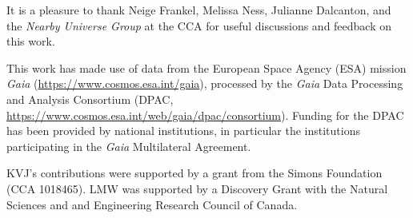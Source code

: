 \documentclass[modern]{aastex631}
\begin{document}
\begin{acknowledgements}

It is a pleasure to thank Neige Frankel, Melissa Ness, Julianne Dalcanton, and the
\textit{Nearby Universe Group} at the CCA for useful discussions and feedback on this
work.



This work has made use of data from the European Space Agency (ESA) mission
{\it Gaia} (\url{https://www.cosmos.esa.int/gaia}), processed by the {\it Gaia}
Data Processing and Analysis Consortium (DPAC,
\url{https://www.cosmos.esa.int/web/gaia/dpac/consortium}). Funding for the DPAC
has been provided by national institutions, in particular the institutions
participating in the {\it Gaia} Multilateral Agreement.

KVJ's contributions were supported by a grant from the Simons Foundation (CCA 1018465).
LMW was supported by a Discovery Grant with the Natural Sciences and and Engineering
Research Council of Canada.

\end{acknowledgements}
\end{document}

